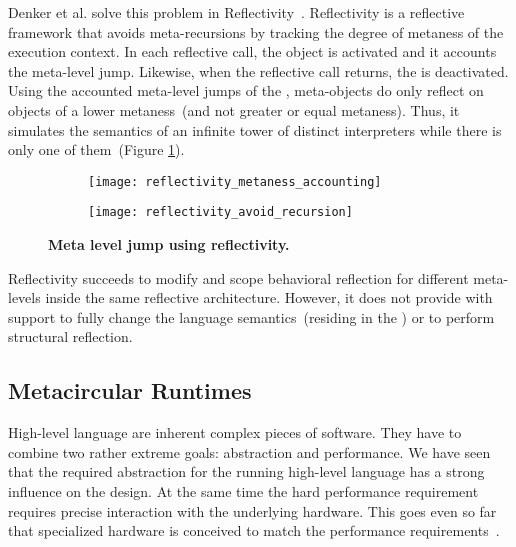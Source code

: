 Denker et al. solve this problem in Reflectivity~\cite{Denk08b}. Reflectivity is a reflective framework that avoids meta-recursions by tracking the degree of metaness of the execution context. In each reflective call, the  object is activated and it accounts the meta-level jump. Likewise, when the reflective call returns, the  is deactivated. Using the accounted meta-level jumps of the , meta-objects do only reflect on objects of a lower metaness~(and not greater or equal metaness). Thus, it simulates the semantics of an infinite tower of distinct interpreters while there is only one of them~(Figure \ref{fig:reflectivity_avoid_meta_recursion}).

\begin{figure}[ht]
\begin{center}
\begin{subfigure}{.45\textwidth}
\texttt{[image: reflectivity\_metaness\_accounting]}
\end{subfigure}
\begin{subfigure}{.45\textwidth}
\texttt{[image: reflectivity\_avoid\_recursion]}
\end{subfigure}
\caption{\textbf{Meta level jump using reflectivity.}\label{fig:reflectivity_avoid_meta_recursion}
 }
\end{center}
\end{figure}

Reflectivity succeeds to modify and scope behavioral reflection for different meta-levels inside the same reflective architecture. However, it does not provide with support to fully change the language semantics~(residing in the \VM) or to perform structural reflection.

\subsection{Metacircular Runtimes}

High-level language \VMs are inherent complex pieces of software.
They have to combine two rather extreme goals: abstraction and performance.
We have seen that the required abstraction for the running high-level language has a strong influence on the \VM design.
At the same time the hard performance requirement requires precise interaction with the underlying hardware.
This goes even so far that specialized hardware is conceived to match the performance requirements~\cite{Unga84a,Stef84a,McGh98a,Clic05a}.

